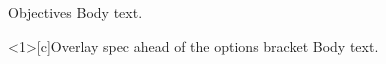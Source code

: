 \documentclass{beamer}
\begin{document}
\begin{frame}[c]{Objectives}
Body text.
\end{frame}

\begin{frame}<1>[c]{Overlay spec ahead of the options bracket}
Body text.
\end{frame}
\end{document}
